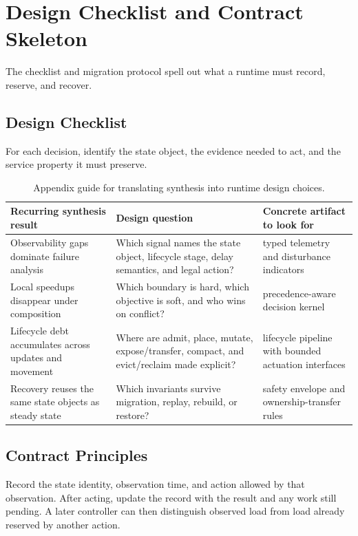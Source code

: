 \section{Design Checklist and Contract Skeleton}

The checklist and migration protocol spell out what a runtime must record, reserve, and recover.

\subsection{Design Checklist}

For each decision, identify the state object, the evidence needed to act, and the service property it must preserve.

\begin{table}[H]
\small
\centering
\caption{Appendix guide for translating synthesis into runtime design choices.}
\label{tab:supp-design-guide}
\begin{tabular}{@{}p{}p{}p{}@{}}
\toprule
Recurring synthesis result & Design question & Concrete artifact to look for \\
\midrule
Observability gaps dominate failure analysis & Which signal names the state object, lifecycle stage, delay semantics, and legal action? & typed telemetry and disturbance indicators \\
Local speedups disappear under composition & Which boundary is hard, which objective is soft, and who wins on conflict? & precedence-aware decision kernel \\
Lifecycle debt accumulates across updates and movement & Where are admit, place, mutate, expose/transfer, compact, and evict/reclaim made explicit? & lifecycle pipeline with bounded actuation interfaces \\
Recovery reuses the same state objects as steady state & Which invariants survive migration, replay, rebuild, or restore? & safety envelope and ownership-transfer rules \\
\bottomrule
\end{tabular}
\end{table}

\subsection{Contract Principles}

Record the state identity, observation time, and action allowed by that observation. After acting, update the record with the result and any work still pending. A later controller can then distinguish observed load from load already reserved by another action.

